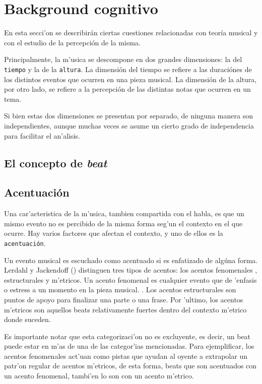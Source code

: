 \section{Background cognitivo}
En esta secci'on se describir\'an ciertas cuestiones relacionadas con teor\'ia musical y con el estudio
de la percepci\'on de la misma. 


Principalmente, la m'usica se descompone en dos grandes dimensiones: la del \texttt{tiempo} y la de la 
\texttt{altura}. La dimensi\'on del tiempo se refiere a las duraci\'ones de los distintos eventos que 
ocurren en una pieza musical. La dimensi\'on de la altura, por otro lado, se refiere a la percepci\'on de las distintas notas que ocurren 
en un tema. 

Si bien estas dos dimensiones se presentan por separado, de ninguna manera son independientes, aunque muchas veces se asume un cierto
grado de independencia para facilitar el an'alisis. 

\subsection{El concepto de \emph{beat}}

\subsection{Acentuaci\'on}
Una car'acteristica de la m'usica, tambien compartida con el habla, es que un mismo evento no es percibido de la misma forma seg'un
el contexto en el que ocurre. Hay varios factores que afectan el contexto, y uno de ellos es la \texttt{acentuaci\'on}. 

Un evento musical es escuchado como acentuado si es enfatizado de alg\'una forma. Lerdahl y Jackendoff (\cita) distinguen tres tipos de 
acentos: los acentos fenomenales , estructurales y m'etricos.
Un acento fenomenal es cualquier evento que de 'enfasis o estress a un momento en la pieza musical. . Los acentos estructurales son puntos de apoyo para finalizar una parte o una frase. 
Por 'ultimo, los acentos m'etricos son aquellos beats relativamente fuertes dentro del contexto m'etrico donde suceden.\newline
{} 

Es importante notar que esta categorizaci'on no es excluyente, es decir, un beat puede estar en m'as de una de las categor'ias mencionadas.
Para ejemplificar, los acentos fenomenales act'uan como pistas que ayudan al oyente a extrapolar un patr'on regular de acentos m'etricos, 
de esta forma, beats que son acentuados con un acento fenomenal, tambi'en lo son con un acento m'etrico.



